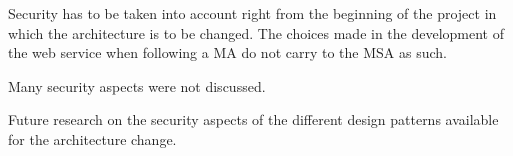 \begin{sloppypar}
    Security has to be taken into account right from the beginning of the
    project in which the architecture is to be changed. The choices made in the
    development of the web service when following a MA do not carry to the MSA
    as such.
\end{sloppypar}
\begin{sloppypar}
    Many security aspects were not discussed.
\end{sloppypar}
\begin{sloppypar}
    Future research on the security aspects of the different design patterns
    available for the architecture change.
\end{sloppypar}




